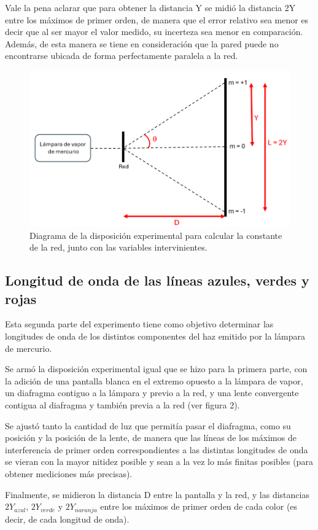 \documentclass[12pt, a4paper]{article}
\begin{document}
Vale la pena aclarar que para obtener la distancia Y se midió la distancia 2Y entre los máximos de primer orden, de manera que el error 
relativo sea menor es decir que al ser mayor el valor medido, su incerteza sea menor en comparación. Además, de esta manera se tiene en 
consideración que la pared puede no encontrarse ubicada de forma perfectamente paralela a la red.

\begin{figure}[!h] 
        \centering \includegraphics[width=0.75\columnwidth]{diagramaExperimental1.png}
        \caption{\label{fig1}Diagrama de la disposición experimental para calcular la constante de la red, junto con las variables 
        intervinientes.}
\end{figure}

\subsection{Longitud de onda de las líneas azules, verdes y rojas}
Esta segunda parte del experimento tiene como objetivo determinar las longitudes de onda de los distintos componentes del haz emitido por 
la lámpara de mercurio. \par Se armó la disposición experimental igual que se hizo para la primera parte, con la adición de una pantalla 
blanca en el extremo opuesto a la lámpara de vapor, un diafragma contiguo a la lámpara y previo a la red, y una lente convergente contigua 
al diafragma y también previa a la red (ver figura 2).\par Se ajustó tanto la cantidad de luz que permitía pasar el diafragma, como su 
posición y la posición de la lente, de manera que las líneas de los máximos de interferencia de primer orden correspondientes a las 
distintas longitudes de onda se vieran con la mayor nitidez posible y sean a la vez lo más finitas posibles (para obtener mediciones más 
precisas). \par Finalmente, se midieron la distancia D entre la pantalla y la red, y las distancias $2Y_{azul}$, $2Y_{verde}$ y 
$2Y_{naranja}$ entre los máximos de primer orden de cada color (es decir, de cada longitud de onda).
\end{document}
